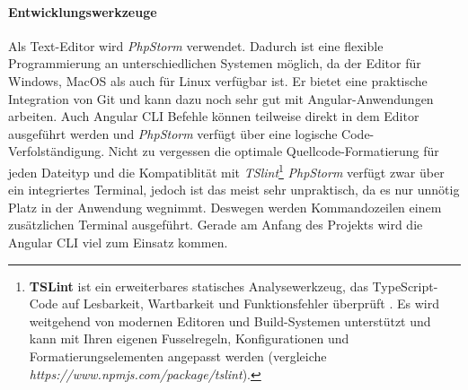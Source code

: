\paragraph{Entwicklungswerkzeuge} Als Text-Editor wird \textit{PhpStorm} verwendet. Dadurch ist eine flexible Programmierung an unterschiedlichen Systemen möglich, da der Editor für Windows, MacOS als auch für Linux verfügbar ist. Er bietet eine praktische Integration von Git und kann dazu noch sehr gut mit Angular-Anwendungen arbeiten. Auch Angular CLI Befehle können teilweise direkt in dem Editor ausgeführt werden und \textit{PhpStorm} verfügt über eine logische Code-Verfolständigung. Nicht zu vergessen die optimale Quellcode-Formatierung für jeden Dateityp und die Kompatiblität mit \textit{TSlint}\footnote{\textbf{TSLint} ist ein erweiterbares statisches Analysewerkzeug, das TypeScript- Code auf Lesbarkeit, Wartbarkeit und Funktionsfehler überprüft . Es wird weitgehend von modernen Editoren und Build-Systemen unterstützt und kann mit Ihren eigenen Fusselregeln, Konfigurationen und Formatierungselementen angepasst werden (vergleiche \textit{https://www.npmjs.com/package/tslint}).} \textit{PhpStorm} verfügt zwar über ein integriertes Terminal, jedoch ist das meist sehr unpraktisch, da es nur unnötig Platz in der Anwendung wegnimmt. Deswegen werden Kommandozeilen einem zusätzlichen Terminal ausgeführt. Gerade am Anfang des Projekts wird die Angular CLI viel zum Einsatz kommen.
%
